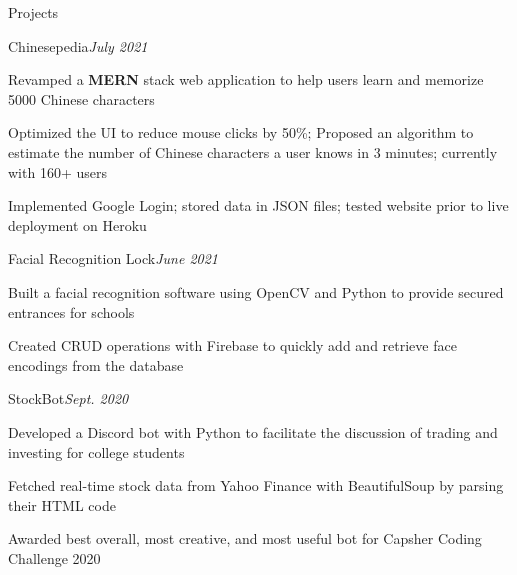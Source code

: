 \documentclass{resume} %
\begin{document}

\begin{rSection}{Projects}
\begin{rSubsection}{Chinesepedia}{\normalfont \textit{July 2021}}{}{}
    \item Revamped a \textbf{MERN} stack web application to help users learn and memorize 5000 Chinese characters
    \item Optimized the UI to reduce mouse clicks by 50\%; Proposed an algorithm to estimate the number of Chinese characters a user knows in 3 minutes; currently with 160+ users
    \item Implemented Google Login; stored data in JSON files; tested website prior to live deployment on Heroku
\end{rSubsection}

\begin{rSubsection}{Facial Recognition Lock}{\normalfont \textit{June 2021}}{}{}
    \item Built a facial recognition software using OpenCV and Python to provide secured entrances for schools
    \item Created CRUD operations with Firebase to quickly add and retrieve face encodings from the database
\end{rSubsection}

\begin{rSubsection}{StockBot}{\normalfont \textit{Sept. 2020}}{}{}
    \item Developed a Discord bot with Python to facilitate the discussion of trading and investing for college students
    \item Fetched real-time stock data from Yahoo Finance with BeautifulSoup by parsing their HTML code
    \item Awarded best overall, most creative, and most useful bot for Capsher Coding Challenge 2020
\end{rSubsection}


\end{rSection}
\end{document}
